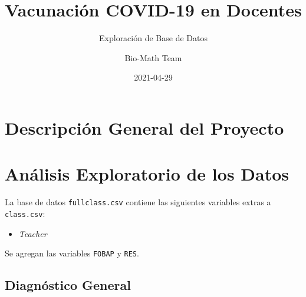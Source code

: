 \documentclass[
]{book}
\title{Vacunación COVID-19 en Docentes}
\subtitle{Exploración de Base de Datos}
\author{Bio-Math Team}
\date{2021-04-29}
\providecommand{\tightlist}{%
  \setlength{\itemsep}{0pt}\setlength{\parskip}{0pt}}
\begin{document}
\maketitle

{
\setcounter{tocdepth}{1}
\tableofcontents
}
\hypertarget{descripciuxf3n-general-del-proyecto}{%
\chapter{Descripción General del Proyecto}\label{descripciuxf3n-general-del-proyecto}}

\hypertarget{EDA}{%
\chapter{Análisis Exploratorio de los Datos}\label{EDA}}

La base de datos \texttt{fullclass.csv} contiene las siguientes variables extras a \texttt{class.csv}:

\begin{itemize}
\tightlist
\item
  \emph{Teacher}
\end{itemize}

Se agregan las variables \texttt{FOBAP} y \texttt{RES}.

\hypertarget{diagnuxf3stico-general}{%
\section{Diagnóstico General}\label{diagnuxf3stico-general}}
\end{document}
